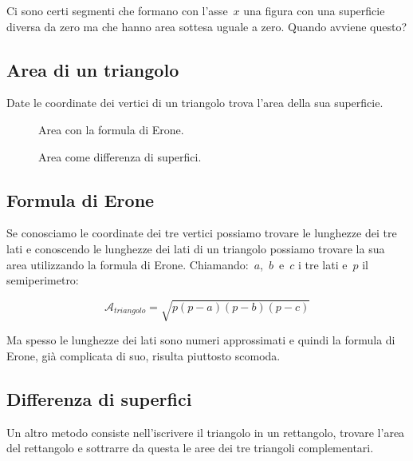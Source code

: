 Ci sono certi segmenti che formano con l'asse~\(x\) una figura con una 
superficie diversa da zero ma che hanno area sottesa uguale a zero.
Quando avviene questo?

\newpage

\subsection{Area di un triangolo}

Date le coordinate dei vertici di un triangolo trova l'area della sua 
superficie.

\begin{inaccessibleblock}
 \begin{figure}[h]
 \centering
 \begin{minipage}[t]{.45\textwidth}
  \centering \triangoloerone
  \caption{Area con la formula di Erone.}\label{fig:triangoloerone}
 \end{minipage}\hfil
 \begin{minipage}[t]{.45\textwidth}
  \centering \triangolodifferenza
  \caption{Area come differenza di superfici.}\label{fig:triangolodifferenza}
 \end{minipage}\hfil
\end{figure}
\end{inaccessibleblock}

\subsection*{Formula di Erone}
Se conosciamo le coordinate dei tre vertici possiamo trovare le lunghezze dei 
tre lati e conoscendo le lunghezze dei lati di un triangolo possiamo trovare
la sua area utilizzando la formula di Erone. Chiamando:~\(a\),~\(b\)~e~\(c\) i 
tre 
lati e~\(p\) il semiperimetro:

\[\mathcal{A}_{triangolo} = \sqrt{p(p-a)(p-b)(p-c)}\]

Ma spesso le lunghezze dei lati sono numeri approssimati e quindi la formula
di Erone, già complicata di suo, risulta piuttosto scomoda.

\subsection*{Differenza di superfici}
Un altro metodo consiste nell'iscrivere il triangolo in un rettangolo, 
trovare l'area del rettangolo e sottrarre da questa le aree dei tre triangoli 
complementari.

